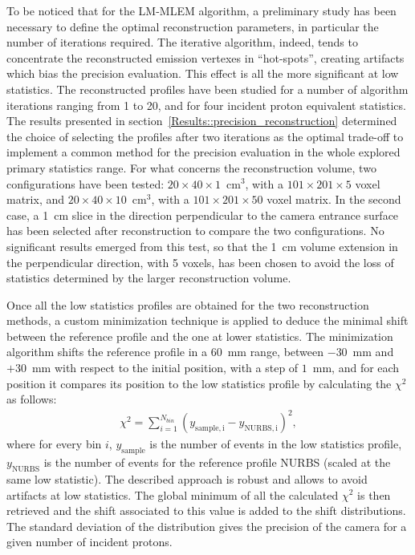 To be noticed that for the LM-MLEM algorithm, a preliminary study has been necessary to define the optimal reconstruction parameters, in particular the number of iterations required. The iterative algorithm, indeed, tends to concentrate the reconstructed emission vertexes in \enquote{hot-spots}, creating artifacts which bias the precision evaluation. This effect is all the more significant at low statistics. The reconstructed profiles have been studied for a number of algorithm iterations ranging from 1 to 20, and for four incident proton equivalent statistics. The results presented in section~\ref{Results::precision_reconstruction} determined the choice of selecting the profiles after two iterations as the optimal trade-off to implement a common method for the precision evaluation in the whole explored primary statistics range. For what concerns the reconstruction volume, two configurations have been tested: $20\times40\times1$~cm$^3$, with a $101\times201\times5$ voxel matrix, and $20\times40\times10$~cm$^3$, with a $101\times201\times50$ voxel matrix. In the second case, a 1~cm slice in the direction perpendicular to the camera entrance surface has been selected after reconstruction to compare the two configurations. No significant results emerged from this test, so that the 1~cm volume extension in the perpendicular direction, with 5 voxels, has been chosen to avoid the loss of statistics determined by the larger reconstruction volume.

Once all the low statistics profiles are obtained for the two reconstruction methods, a custom minimization technique is applied to deduce the minimal shift between the reference profile and the one at lower statistics. The minimization algorithm shifts the reference profile in a 60~mm range, between $-30$~mm and $+30$~mm with respect to the initial position, with a step of $1$~mm, and for each position it compares its position to the low statistics profile by calculating the $\chi^2$ as follows:
\begin{eqnarray}
\chi^2 = \sum\limits_{i=1}^{N_{bin}} {(y_{\mathrm{sample,i}}-y_{\mathrm{NURBS,i}})^2},
\end{eqnarray}
where for every bin $i$, $y_{\mathrm{sample}}$ is the number of events in the low statistics profile, $y_{\mathrm{NURBS}}$ is the number of events for the reference profile NURBS (scaled at the same low statistic). 
The described approach is robust and allows to avoid artifacts at low statistics.
The global minimum of all the calculated $\chi^2$ is then retrieved and the shift associated to this value is added to the shift distributions. 
The standard deviation of the distribution gives the precision of the camera for a given number of incident protons. 
